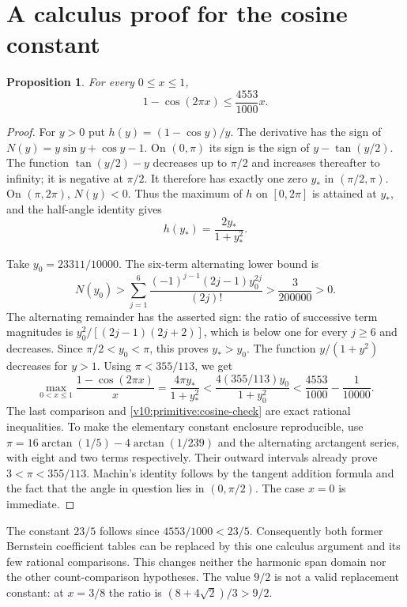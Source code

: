 \documentclass[11pt,a4paper]{article}
\newtheorem{theorem}{Proposition}
\begin{document}
\section{A calculus proof for the cosine constant}
\begin{theorem}\label{v10:primitive:cosine}
For every $0\le x\le1$,
\[
 1-\cos(2\pi x)\le\frac{4553}{1000}x.
\]
\end{theorem}
\begin{proof}
For $y>0$ put $h(y)=(1-\cos y)/y$. The derivative has the sign of
$N(y)=y\sin y+\cos y-1$. On $(0,\pi)$ its sign is the sign of
$y-\tan(y/2)$. The function $\tan(y/2)-y$ decreases up to $\pi/2$
and increases thereafter to infinity; it is negative at $\pi/2$.
It therefore has exactly one zero $y_*$ in $(\pi/2,\pi)$.
On $(\pi,2\pi)$, $N(y)<0$. Thus the maximum of $h$ on $[0,2\pi]$
is attained at $y_*$, and the half-angle identity gives
\[
 h(y_*)=\frac{2y_*}{1+y_*^2}.
\]

Take $y_0=23311/10000$. The six-term alternating lower bound is
\begin{equation}\label{v10:primitive:cosine-check}
 N(y_0)>\sum_{j=1}^{6}
   \frac{(-1)^{j-1}(2j-1)y_0^{2j}}{(2j)!}
 >\frac3{200000}>0.
\end{equation}
The alternating remainder has the asserted sign: the ratio of successive
term magnitudes is $y_0^2/[(2j-1)(2j+2)]$, which is below one for every
$j\ge6$ and decreases. Since $\pi/2<y_0<\pi$, this proves $y_* > y_0$.
The function $y/(1+y^2)$ decreases for $y>1$. Using $\pi<355/113$, we get
\[
 \max_{0<x\le1}\frac{1-\cos(2\pi x)}x
 =\frac{4\pi y_*}{1+y_*^2}
 <\frac{4(355/113)y_0}{1+y_0^2}
 <\frac{4553}{1000}-\frac1{10000}.
\]
The last comparison and \eqref{v10:primitive:cosine-check} are exact
rational inequalities. To make the elementary constant enclosure
reproducible, use
$\pi=16\arctan(1/5)-4\arctan(1/239)$ and the alternating arctangent
series, with eight and two terms respectively. Their outward intervals
already prove $3<\pi<355/113$. Machin's identity follows by the tangent
addition formula and the fact that the angle in question lies in $(0,\pi/2)$.
The case $x=0$ is immediate.
\end{proof}

The constant $23/5$ follows since $4553/1000<23/5$.
Consequently both former Bernstein coefficient tables can be replaced by
this one calculus argument and its few rational comparisons. This changes
neither the harmonic span domain nor the other count-comparison hypotheses.
The value $9/2$ is not a valid replacement constant: at $x=3/8$ the ratio
is $(8+4\sqrt2)/3>9/2$.
\end{document}
